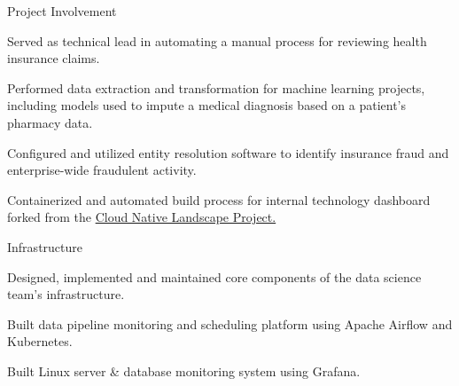 \documentclass[]{deedy-resume-openfont}
\begin{document}
\vspace{\topsep} 
\begin{tightemize}
\item Project Involvement
    \vspace{\topsep}
    \begin{tightemize}
    \item Served as technical lead in automating a manual process for reviewing health insurance claims.
    \item Performed data extraction and transformation for machine learning projects, including models used to impute a medical diagnosis based on a patient's pharmacy data.
    \item Configured and utilized entity resolution software to identify insurance fraud and enterprise-wide fraudulent activity.
    \item Containerized and automated build process for internal technology dashboard forked from the \href{https://github.com/cncf/landscape}{Cloud Native Landscape Project.}
    \end{tightemize}
    \vspace{\topsep}
\item Infrastructure
    \vspace{\topsep}
    \begin{tightemize}
    \item Designed, implemented and maintained core components of the data science team's infrastructure.
    \item Built data pipeline monitoring and scheduling platform using Apache Airflow and Kubernetes.
    \item Built Linux server \& database monitoring system using Grafana.

\end{tightemize}
\end{tightemize}
\end{document}
